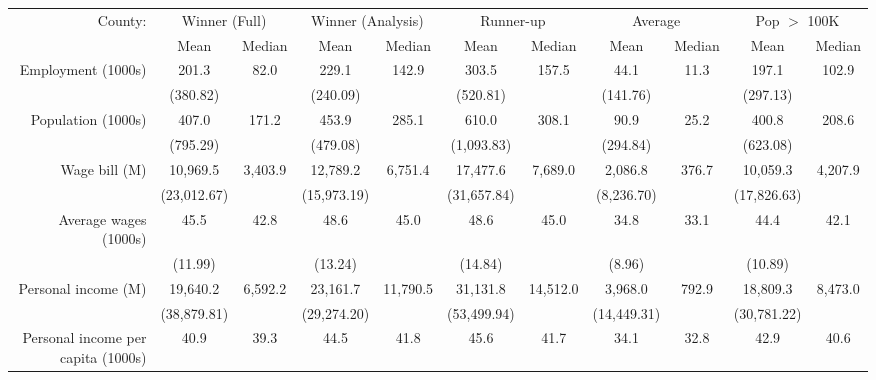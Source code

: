 \begin{tabular}{r*{5}{c}*{5}{c}} \toprule 
County:             &\multicolumn{2}{c}{Winner (Full)}&\multicolumn{2}{c}{Winner (Analysis)}&\multicolumn{2}{c}{Runner-up}&\multicolumn{2}{c}{Average}&\multicolumn{2}{c}{Pop $ >$ 100K }\\\cline{2-11}
                    &        Mean&      Median&        Mean&      Median&        Mean&      Median&        Mean&      Median&        Mean&      Median\\
\midrule
Employment (1000s)  &       201.3&        82.0&       229.1&       142.9&       303.5&       157.5&        44.1&        11.3&       197.1&       102.9\\
                    &    (380.82)&            &    (240.09)&            &    (520.81)&            &    (141.76)&            &    (297.13)&            \\
Population (1000s)  &       407.0&       171.2&       453.9&       285.1&       610.0&       308.1&        90.9&        25.2&       400.8&       208.6\\
                    &    (795.29)&            &    (479.08)&            &  (1,093.83)&            &    (294.84)&            &    (623.08)&            \\
Wage bill (M)       &    10,969.5&     3,403.9&    12,789.2&     6,751.4&    17,477.6&     7,689.0&     2,086.8&       376.7&    10,059.3&     4,207.9\\
                    & (23,012.67)&            & (15,973.19)&            & (31,657.84)&            &  (8,236.70)&            & (17,826.63)&            \\
Average wages (1000s)&        45.5&        42.8&        48.6&        45.0&        48.6&        45.0&        34.8&        33.1&        44.4&        42.1\\
                    &     (11.99)&            &     (13.24)&            &     (14.84)&            &      (8.96)&            &     (10.89)&            \\
Personal income (M) &    19,640.2&     6,592.2&    23,161.7&    11,790.5&    31,131.8&    14,512.0&     3,968.0&       792.9&    18,809.3&     8,473.0\\
                    & (38,879.81)&            & (29,274.20)&            & (53,499.94)&            & (14,449.31)&            & (30,781.22)&            \\
Personal income per capita (1000s)&        40.9&        39.3&        44.5&        41.8&        45.6&        41.7&        34.1&        32.8&        42.9&        40.6\\

\end{tabular}
